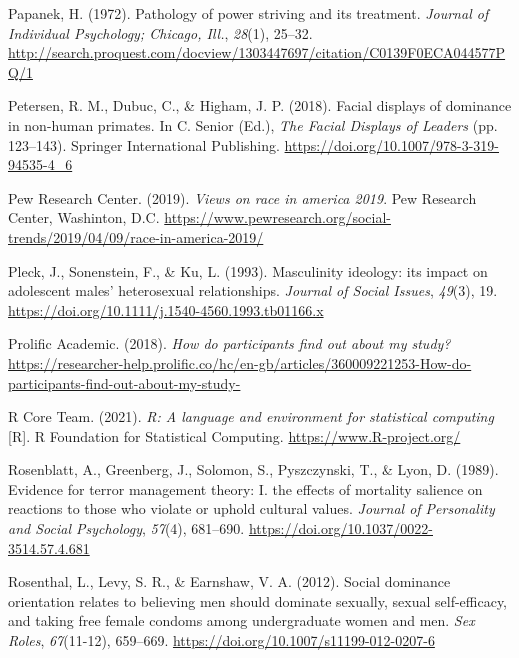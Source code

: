\documentclass[
  donotrepeattitle,doc, 12pt, a4paper,floatsintext]{apa7}
\newlength{\cslhangindent}
\newlength{\cslentryspacingunit} %
\newenvironment{CSLReferences}[2] %
 {%
  \setlength{\parindent}{0pt}
  \ifodd #1
  \let\oldpar\par
  \def\par{\hangindent=\cslhangindent\oldpar}
  \fi
  \setlength{\parskip}{#2\cslentryspacingunit}
 }%
 {}
\begin{document}
\begin{CSLReferences}{1}{0}
\leavevmode{}%
Papanek, H. (1972). Pathology of power striving and its treatment. \emph{Journal of Individual Psychology; Chicago, Ill.}, \emph{28}(1), 25--32. \url{http://search.proquest.com/docview/1303447697/citation/C0139F0ECA044577PQ/1}

\leavevmode{}%
Petersen, R. M., Dubuc, C., \& Higham, J. P. (2018). Facial displays of dominance in non-human primates. In C. Senior (Ed.), \emph{The Facial Displays of Leaders} (pp. 123--143). Springer International Publishing. \url{https://doi.org/10.1007/978-3-319-94535-4_6}

\leavevmode{}%
Pew Research Center. (2019). \emph{Views on race in america 2019}. Pew Research Center, Washinton, D.C. \url{https://www.pewresearch.org/social-trends/2019/04/09/race-in-america-2019/}

\leavevmode{}%
Pleck, J., Sonenstein, F., \& Ku, L. (1993). Masculinity ideology: its impact on adolescent males' heterosexual relationships. \emph{Journal of Social Issues}, \emph{49}(3), 19. \url{https://doi.org/10.1111/j.1540-4560.1993.tb01166.x}

\leavevmode{}%
Prolific Academic. (2018). \emph{How do participants find out about my study?} \url{https://researcher-help.prolific.co/hc/en-gb/articles/360009221253-How-do-participants-find-out-about-my-study-}

\leavevmode{}%
R Core Team. (2021). \emph{R: A language and environment for statistical computing} {[}R{]}. R Foundation for Statistical Computing. \url{https://www.R-project.org/}

\leavevmode{}%
Rosenblatt, A., Greenberg, J., Solomon, S., Pyszczynski, T., \& Lyon, D. (1989). Evidence for terror management theory: I. the effects of mortality salience on reactions to those who violate or uphold cultural values. \emph{Journal of Personality and Social Psychology}, \emph{57}(4), 681--690. \url{https://doi.org/10.1037/0022-3514.57.4.681}

\leavevmode{}%
Rosenthal, L., Levy, S. R., \& Earnshaw, V. A. (2012). Social dominance orientation relates to believing men should dominate sexually, sexual self-efficacy, and taking free female condoms among undergraduate women and men. \emph{Sex Roles}, \emph{67}(11-12), 659--669. \url{https://doi.org/10.1007/s11199-012-0207-6}


\end{CSLReferences}
\end{document}
